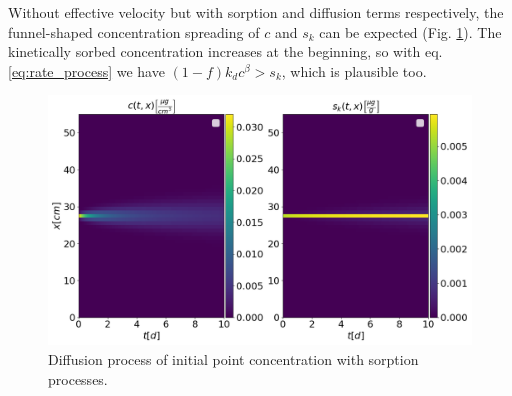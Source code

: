 Without effective velocity but with sorption and diffusion terms respectively, the funnel-shaped concentration spreading of $c$ and $s_k$ can be expected (Fig. \ref{fig:sol_basic_disp}). The kinetically sorbed concentration increases at the beginning, so with eq. \ref{eq:rate_process} we have $(1-f)k_dc^{\beta} > s_k$, which is plausible too.
\begin{figure}[h!]
	\centering
	\includegraphics[scale=0.4]{images/sol_basic_disp.png}
\caption[Plausibility check: Dispersion and Sorption]{Diffusion process of initial point concentration with sorption processes.}
\label{fig:sol_basic_disp}
\end{figure}
\FloatBarrier
